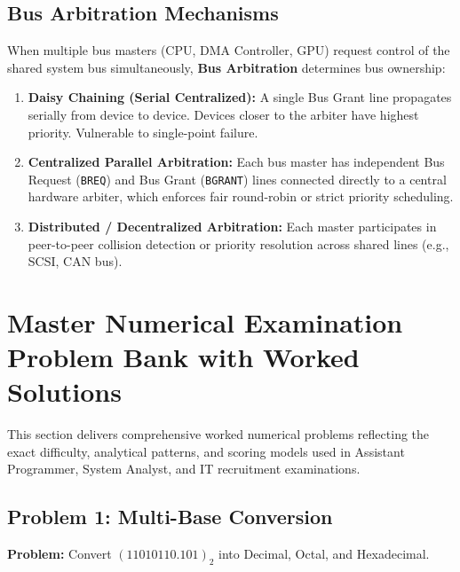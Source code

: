 \subsection{Bus Arbitration Mechanisms}
When multiple bus masters (CPU, DMA Controller, GPU) request control of the shared system bus simultaneously, \textbf{Bus Arbitration} determines bus ownership:
\begin{enumerate}[label=\bfseries\arabic*.]
    \item \textbf{Daisy Chaining (Serial Centralized):} A single Bus Grant line propagates serially from device to device. Devices closer to the arbiter have highest priority. Vulnerable to single-point failure.
    \item \textbf{Centralized Parallel Arbitration:} Each bus master has independent Bus Request (\texttt{BREQ}) and Bus Grant (\texttt{BGRANT}) lines connected directly to a central hardware arbiter, which enforces fair round-robin or strict priority scheduling.
    \item \textbf{Distributed / Decentralized Arbitration:} Each master participates in peer-to-peer collision detection or priority resolution across shared lines (e.g., SCSI, CAN bus).
\end{enumerate}



\section{Master Numerical Examination Problem Bank with Worked Solutions}
\label{sec:numerical_problems}

This section delivers comprehensive worked numerical problems reflecting the exact difficulty, analytical patterns, and scoring models used in Assistant Programmer, System Analyst, and IT recruitment examinations.

\subsection{Problem 1: Multi-Base Conversion}
\textbf{Problem:} Convert $(11010110.101)_2$ into Decimal, Octal, and Hexadecimal.

